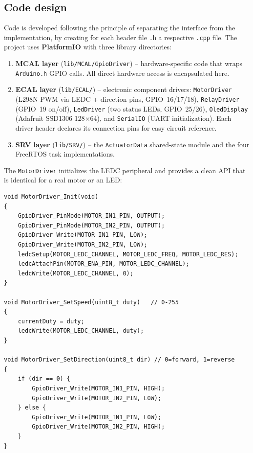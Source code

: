 \clearpage
\subsection{Code design}

Code is developed following the principle of separating the interface from the
implementation, by creating for each header file \texttt{.h} a respective \texttt{.cpp}
file. The project uses \textbf{PlatformIO} with three library directories:

\begin{enumerate}
  \item \textbf{MCAL layer} (\texttt{lib/MCAL/GpioDriver}) -- hardware-specific code
    that wraps \texttt{Arduino.h} GPIO calls. All direct hardware access is encapsulated
    here.
  \item \textbf{ECAL layer} (\texttt{lib/ECAL/}) -- electronic component drivers:
    \texttt{MotorDriver} (L298N PWM via LEDC + direction pins, GPIO~16/17/18),
    \texttt{RelayDriver} (GPIO~19 on/off),
    \texttt{LedDriver} (two status LEDs, GPIO~25/26),
    \texttt{OledDisplay} (Adafruit SSD1306 128$\times$64), and
    \texttt{SerialIO} (UART initialization).
    Each driver header declares its connection pins for easy circuit reference.
  \item \textbf{SRV layer} (\texttt{lib/SRV/}) -- the \texttt{ActuatorData} shared-state
    module and the four FreeRTOS task implementations.
\end{enumerate}

The \texttt{MotorDriver} initializes the LEDC peripheral and provides a clean API that
is identical for a real motor or an LED:

\begin{lstlisting}
void MotorDriver_Init(void)
{
    GpioDriver_PinMode(MOTOR_IN1_PIN, OUTPUT);
    GpioDriver_PinMode(MOTOR_IN2_PIN, OUTPUT);
    GpioDriver_Write(MOTOR_IN1_PIN, LOW);
    GpioDriver_Write(MOTOR_IN2_PIN, LOW);
    ledcSetup(MOTOR_LEDC_CHANNEL, MOTOR_LEDC_FREQ, MOTOR_LEDC_RES);
    ledcAttachPin(MOTOR_ENA_PIN, MOTOR_LEDC_CHANNEL);
    ledcWrite(MOTOR_LEDC_CHANNEL, 0);
}

void MotorDriver_SetSpeed(uint8_t duty)   // 0-255
{
    currentDuty = duty;
    ledcWrite(MOTOR_LEDC_CHANNEL, duty);
}

void MotorDriver_SetDirection(uint8_t dir) // 0=forward, 1=reverse
{
    if (dir == 0) {
        GpioDriver_Write(MOTOR_IN1_PIN, HIGH);
        GpioDriver_Write(MOTOR_IN2_PIN, LOW);
    } else {
        GpioDriver_Write(MOTOR_IN1_PIN, LOW);
        GpioDriver_Write(MOTOR_IN2_PIN, HIGH);
    }
}
\end{lstlisting}

